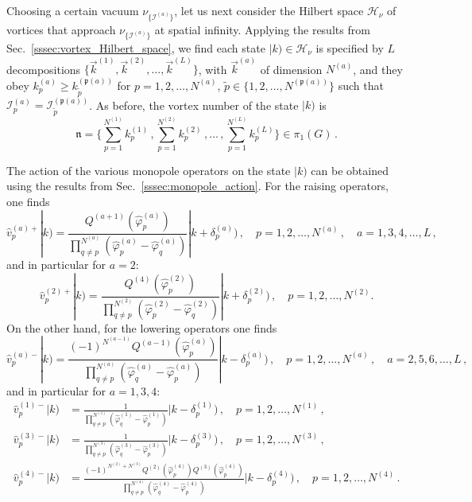 \documentclass[12pt,a4paper]{article}
\newcommand{\nn}{\mathfrak{n}}
\renewcommand{\(}{\left(}
\renewcommand{\)}{\right)}
\renewcommand{\(}{\left(}
\renewcommand{\)}{\right)}
\begin{document}
Choosing a certain vacuum $\nu_{\{\mathcal{I}^{(a)}\}}$, let us next consider the Hilbert space $\mathcal{H}_\nu$ of vortices that approach $\nu_{\{\mathcal{I}^{(a)}\}}$ at spatial infinity. 
Applying the results from Sec.~\ref{sssec:vortex_Hilbert_space}, we find each state $|k)\in\mathcal{H}_\nu$ is specified by $L$ decompositions $\{\vec{k}^{(1)},\vec{k}^{(2)},\dots,\vec{k}^{(L)}\}$, with $\vec{k}^{(a)}$ of dimension $N^{(a)}$,
and they obey $k^{(a)}_p\geq k^{(\mathfrak{p}(a))}_{\tilde{p}}$ for $p=1,2,\dots,N^{(a)}$, $\tilde{p}\in\{1,2,\dots,N^{(\mathfrak{p}(a))}\}$ such that $\mathcal{I}^{(a)}_p=\mathcal{I}^{(\mathfrak{p}(a))}_{\tilde{p}}$. 
As before, the vortex number of the state $|k)$ is 
\begin{equation}
 \nn=\{\sum_{p=1}^{N^{(1)}}k^{(1)}_p\,,\sum_{p=1}^{N^{(2)}}k^{(2)}_p\,,\dots\,,\sum_{p=1}^{N^{(L)}}k^{(L)}_p\}\in \pi_1(G)\,.
\end{equation}


The action of the various monopole operators on the state $|k)$ can be obtained using the results from Sec.~\ref{sssec:monopole_action}. 
For the raising operators, one finds
\begin{equation}
    \hat{v}^{(a)+}_p|k)=\frac{Q^{(a+1)}(\hat{\varphi}^{(a)}_p)}{\prod_{q\neq p}^{N^{(a)}}(\hat{\varphi}^{(a)}_p-\hat{\varphi}^{(a)}_q)}|k+\delta^{(a)}_p)\,,\quad p=1,2,\dots,N^{(a)}\,,\quad a=1,3,4,\dots,L\,,
\end{equation}
and in particular for $a=2$:
\begin{equation}
    \hat{v}^{(2)+}_p|k)=\frac{Q^{(4)}(\hat{\varphi}^{(2)}_p)}{\prod_{q\neq p}^{N^{(2)}}(\hat{\varphi}^{(2)}_p-\hat{\varphi}^{(2)}_q)}|k+\delta^{(2)}_p)\,,\quad p=1,2,\dots,N^{(2)}.
\end{equation}
On the other hand, for the lowering operators one finds
\begin{equation}
     \hat{v}^{(a)-}_p|k)=\frac{(-1)^{N^{(a-1)}}Q^{(a-1)}(\hat{\varphi}^{(a)}_p)}{\prod_{q\neq p}^{N^{(a)}}(\hat{\varphi}^{(a)}_q-\hat{\varphi}^{(a)}_p)}|k-\delta^{(a)}_p)\,,\quad p=1,2,\dots,N^{(a)}\,,\quad a=2,5,6,\dots,L\,,
\end{equation}
and in particular for $a=1,3,4$:
\begin{equation}
\begin{aligned}
\hat{v}^{(1)-}_p|k)&=\frac{1}{\prod_{q\neq p}^{N^{(1)}}(\hat{\varphi}^{(1)}_q-\hat{\varphi}^{(1)}_p)}|k-\delta^{(1)}_p)\,,\quad p=1,2,\dots,N^{(1)}\,,\\
\hat{v}^{(3)-}_p|k)&=\frac{1}{\prod_{q\neq p}^{N^{(3)}}(\hat{\varphi}^{(3)}_q-\hat{\varphi}^{(3)}_p)}|k-\delta^{(3)}_p)\,,\quad p=1,2,\dots,N^{(3)}\,,\\
\hat{v}^{(4)-}_p|k)&=\frac{(-1)^{N^{(2)}+N^{(3)}}Q^{(2)}(\hat{\varphi}^{(4)}_p)Q^{(3)}(\hat{\varphi}^{(4)}_p)}{\prod_{q\neq p}^{N^{(4)}}(\hat{\varphi}^{(4)}_q-\hat{\varphi}^{(4)}_p)}|k-\delta^{(4)}_p)\,,\quad p=1,2,\dots,N^{(4)}\,.
\end{aligned}
\end{equation}
\end{document}

